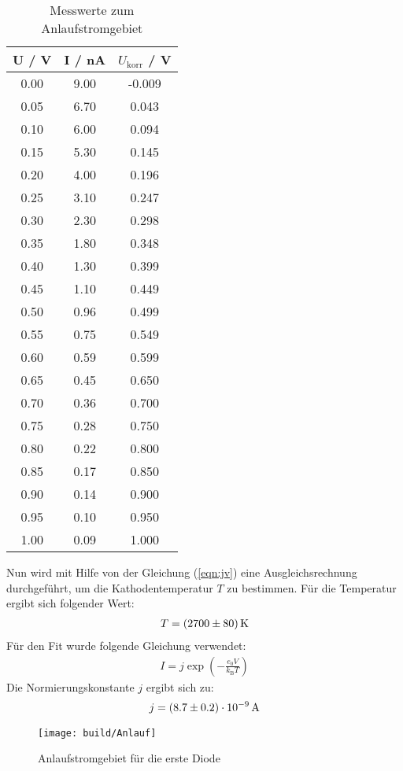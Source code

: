 \begin{table}[H] %
  \centering
  \begin{tabular}{c | c | c}
    \toprule
    U / V & I / nA & $U_\text{korr}$ / V \\
    \midrule
    0.00 & 9.00 &-0.009 \\
    0.05 & 6.70 & 0.043 \\
    0.10 & 6.00 & 0.094 \\
    0.15 & 5.30 & 0.145 \\
    0.20 & 4.00 & 0.196 \\
    0.25 & 3.10 & 0.247 \\
    0.30 & 2.30 & 0.298 \\
    0.35 & 1.80 & 0.348 \\
    0.40 & 1.30 & 0.399 \\
    0.45 & 1.10 & 0.449 \\
    0.50 & 0.96 & 0.499 \\
    0.55 & 0.75 & 0.549 \\
    0.60 & 0.59 & 0.599 \\
    0.65 & 0.45 & 0.650 \\
    0.70 & 0.36 & 0.700 \\
    0.75 & 0.28 & 0.750 \\
    0.80 & 0.22 & 0.800 \\
    0.85 & 0.17 & 0.850 \\
    0.90 & 0.14 & 0.900 \\
    0.95 & 0.10 & 0.950 \\
    1.00 & 0.09 & 1.000 \\
    \bottomrule
  \end{tabular}
  \caption{Messwerte zum Anlaufstromgebiet}
  \label{tab:Messdaten2}
\end{table}

Nun wird mit Hilfe von der Gleichung (\ref{eqn:jv}) eine Ausgleichsrechnung durchgeführt, um die Kathodentemperatur $T$ zu bestimmen. Für die Temperatur ergibt sich folgender Wert:
\begin{align*}
  T = (\num{2700 +- 80}) \, \text{K}
\end{align*}
Für den Fit wurde folgende Gleichung verwendet:
\begin{align*}
  I = j \exp\left( - \frac{e_0 V}{k_\text{B} T} \right)
\end{align*}
Die Normierungskonstante $j$ ergibt sich zu:
\begin{align*}
  j = (\num{8.7 +- 0.2}) \cdot 10^{-9} \, \text{A}
\end{align*}
\begin{figure}[H]
  \centering
  \texttt{[image: build/Anlauf]}
  \caption{Anlaufstromgebiet für die erste Diode}
  \label{fig:anlauf}
\end{figure}


